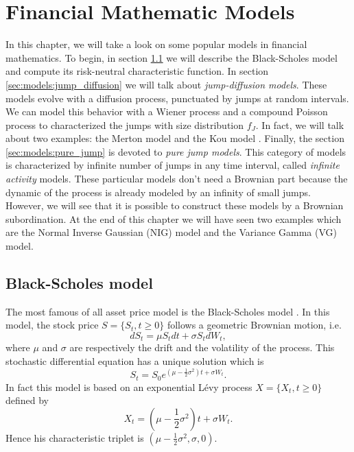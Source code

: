 \chapter{Financial Mathematic Models}
\label{sec:models}


In this chapter, we will take a look on some popular models in financial mathematics. To begin, in section \ref{sec:models:BS} we will describe the Black-Scholes model \citeyearpar{BS73} and compute its risk-neutral characteristic function. In section \ref{sec:models:jump_diffusion} we will talk about \textit{jump-diffusion models}. These models evolve with a diffusion process, punctuated by jumps at random intervals. We can model this behavior with a Wiener process and a compound Poisson process to characterized the jumps with size distribution $f_J$. In fact, we will talk about two examples: the Merton model \citeyearpar{Mer76} and the Kou model \citeyearpar{Kou02}. Finally, the section \ref{sec:models:pure_jump} is devoted to \textit{pure jump models}. This category of models is characterized by infinite number of jumps in any time interval, called \textit{infinite activity} models. These particular models don't need a Brownian part because the dynamic of the process is already modeled by an infinity of small jumps. However, we will see that it is possible to construct these models by a Brownian subordination. At the end of this chapter we will have seen two examples which are the Normal Inverse Gaussian (NIG) model and the Variance Gamma (VG) model.

\section{Black-Scholes model}
\label{sec:models:BS}
The most famous of all asset price model is the Black-Scholes model \citeyearpar{BS73}. In this model, the stock price $S=\{S_t,t\geq0\}$ follows a geometric Brownian motion, i.e.
$$dS_t = \mu S_t dt + \sigma S_t dW_t,$$
where $\mu$ and $\sigma$ are respectively the drift and the volatility of the process. This stochastic differential equation has a unique solution which is
$$S_t = S_0e^{\left(\mu-\frac{1}{2}\sigma^2\right)t+\sigma W_t}.$$
In fact this model is based on an exponential L\'evy process $X=\{X_t,t\geq0\}$ defined by
$$X_t = \left(\mu - \frac{1}{2}\sigma^2\right)t + \sigma W_t.$$
Hence his characteristic triplet is $\left(\mu-\frac{1}{2}\sigma^2,\sigma,0\right)$.

